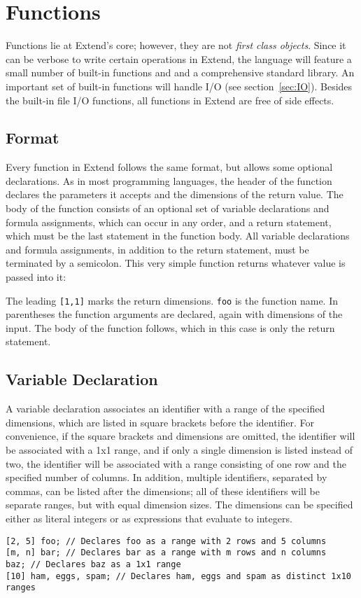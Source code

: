 \section{Functions}
\label{sec:Functions}
Functions lie at Extend's core; however, they are not \textit{first class objects}. Since it can be verbose to write certain operations in Extend, the language will feature a small number of built-in functions and and a comprehensive standard library. An important set of built-in functions will handle I/O (see section~\ref{sec:IO}). Besides the built-in file I/O functions, all functions in Extend are free of side effects.
\subsection{Format}
\label{sec:funcdecl}
Every function in Extend follows the same format, but allows some optional declarations. As in most programming languages, the header of the function declares the parameters it accepts and the dimensions of the return value. The body of the function consists of an optional set of variable declarations and formula assignments, which can occur in any order, and a return statement, which must be the last statement in the function body. All variable declarations and formula assignments, in addition to the return statement, must be terminated by a semicolon.
This very simple function returns whatever value is passed into it:

The leading \texttt{[1,1]} marks the return dimensions. \texttt{foo} is the function name. In parentheses the function arguments are declared, again with dimensions of the input. The body of the function follows, which in this case is only the return statement.
\subsection{Variable Declaration}
\label{sec:vardecl}
A variable declaration associates an identifier with a range of the specified dimensions, which are listed in square brackets before the identifier. For convenience, if the square brackets and dimensions are omitted, the identifier will be associated with a 1x1 range, and if only a single dimension is listed instead of two, the identifier will be associated with a range consisting of one row and the specified number of columns. In addition, multiple identifiers, separated by commas, can be listed after the dimensions; all of these identifiers will be separate ranges, but with equal dimension sizes. The dimensions can be specified either as literal integers or as expressions that evaluate to integers. 
\begin{lstlisting}
[2, 5] foo; // Declares foo as a range with 2 rows and 5 columns
[m, n] bar; // Declares bar as a range with m rows and n columns
baz; // Declares baz as a 1x1 range
[10] ham, eggs, spam; // Declares ham, eggs and spam as distinct 1x10 ranges
\end{lstlisting}
